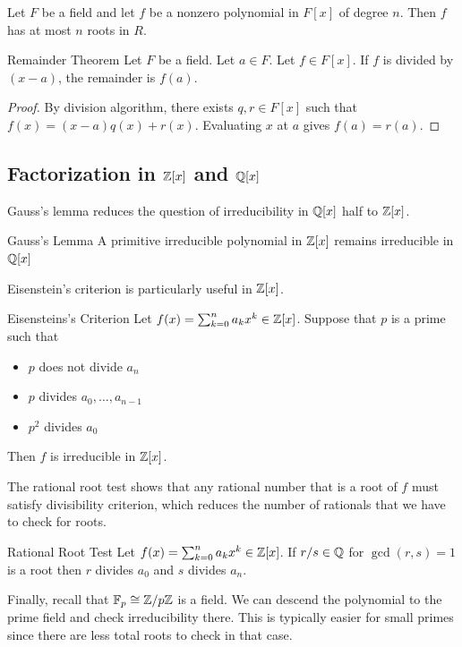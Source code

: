 \documentclass[a4paper]{article}
\begin{document}
\begin{prp}{}{} Let $F$ be a field and let $f$ be a nonzero polynomial in $F[x]$ of degree $n$. Then $f$ has at most $n$ roots in $R$. 
\end{prp}

\begin{thm}{Remainder Theorem}{} Let $F$ be a field. Let $a\in F$. Let $f\in F[x]$. If $f$ is divided by $(x-a)$, the remainder is $f(a)$. \tcbline
\begin{proof}
By division algorithm, there exists $q,r\in F[x]$ such that $f(x)=(x-a)q(x)+r(x)$. Evaluating $x$ at $a$ gives $f(a)=r(a)$. 
\end{proof}
\end{thm}

\subsection{Factorization in $\mathbb{Z}[x]$ and $\mathbb{Q}[x]$}
Gauss's lemma reduces the question of irreducibility in $\mathbb{Q}[x]$ half to $\mathbb{Z}[x]$. 

\begin{thm}{Gauss's Lemma}{} A primitive irreducible polynomial in $\mathbb{Z}[x]$ remains irreducible in $\mathbb{Q}[x]$
\end{thm}

Eisenstein's criterion is particularly useful in $\mathbb{Z}[x]$. 

\begin{thm}{Eisensteins's Criterion}{} Let $f(x)=\sum_{k=0}^na_kx^k\in\mathbb{Z}[x]$. Suppose that $p$ is a prime such that 
\begin{itemize}
\item $p$ does not divide $a_n$
\item $p$ divides $a_0,\dots,a_{n-1}$
\item $p^2$ divides $a_0$
\end{itemize}
Then $f$ is irreducible in $\mathbb{Z}[x]$. 
\end{thm}

The rational root test shows that any rational number that is a root of $f$ must satisfy divisibility criterion, which reduces the number of rationals that we have to check for roots. 

\begin{thm}{Rational Root Test}{} Let $f(x)=\sum_{k=0}^na_kx^k\in\mathbb{Z}[x]$. If $r/s\in\mathbb{Q}$ for $\gcd(r,s)=1$ is a root then $r$ divides $a_0$ and $s$ divides $a_n$. 
\end{thm}

Finally, recall that $\mathbb{F}_p\cong\mathbb{Z}/p\mathbb{Z}$ is a field. We can descend the polynomial to the prime field and check irreducibility there. This is typically easier for small primes since there are less total roots to check in that case. 
\end{document}
